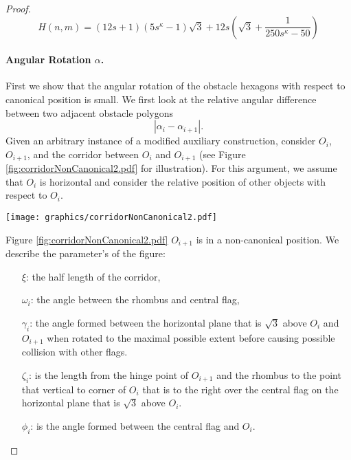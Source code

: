 \documentclass[10pt]{CSUNthesis}
\theoremstyle{plain}%
\theoremstyle{definition}
\theoremstyle{remark}
\newcommand{\lr}[1]{\left( #1 \right)}
\begin{document}
\begin{proof}
\begin{equation}\label{eqn:Hnm}
	H(n,m) = (12s+1)  \lr{5s^\kappa -1}  \sqrt{3} + 12s \lr{\sqrt{3}+ \frac{1}{250s^\kappa -50}}				
\end{equation}\paragraph{Angular Rotation $\alpha$.}
First we show that the angular rotation of the obstacle hexagons with respect to canonical position is small.  
We first look at the relative angular difference between two adjacent obstacle polygons
$$\left\vert \alpha_i - \alpha_{i+1} \right\vert.$$
Given an arbitrary instance of a modified auxiliary construction, consider $O_i$, $O_{i+1}$, and the corridor between $O_i$ and $O_{i+1}$ (see Figure \ref{fig:corridorNonCanonical2.pdf} for illustration).  
For this argument, we assume that $O_i$ is horizontal and consider the relative position of other objects with respect to $O_{i}$.

\begin{minipage}{\linewidth}
\begin{center}
\texttt{[image: graphics/corridorNonCanonical2.pdf]}
\label{fig:corridorNonCanonical2.pdf}
\end{center}
\end{minipage}

Figure \ref{fig:corridorNonCanonical2.pdf} $O_{i+1}$ is in a non-canonical position.  We describe the parameter's of the figure:
\begin{itemize}[leftmargin=.75in, rightmargin=.75in]
	\item[$\xi$:] the half length of the corridor,
	\item[$\omega_i$:] the angle between the rhombus and central flag, 
	\item[$\gamma_i$:] the angle formed between the horizontal plane that is $\sqrt{3}$ above $O_i$ and $O_{i+1}$ when rotated to the maximal possible extent before causing possible collision with other flags. 
	\item[$\zeta_i$:]  is the length from the hinge point of $O_{i+1}$ and the rhombus to the point that vertical to corner of $O_i$ that is to the right over the central flag on the horizontal plane that is $\sqrt{3}$ above $O_i$.
	\item[$\phi_i$:] is the angle formed between the central flag and $O_i$.
\end{itemize}


\end{proof}
\end{document}
